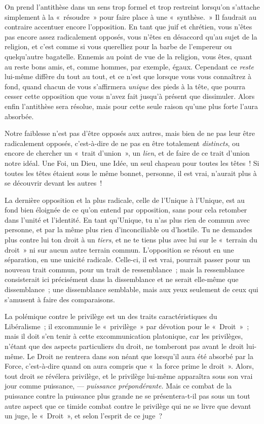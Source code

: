 \documentclass[french,twoside]{book} %
\begin{document}
On prend l’antithèse dans un sens trop formel et trop restreint lorsqu’on s’attache simplement à la « résoudre » pour faire place à une « synthèse. » Il faudrait au contraire accentuer encore l’opposition. En tant que juif et chrétien, vous n’êtes pas encore assez radicalement opposés, vous n’êtes en désaccord qu’au sujet de la religion, et c’est comme si vous querelliez pour la barbe de l’empereur ou quelqu’autre bagatelle. Ennemis au point de vue de la religion, vous êtes, quant au reste bons amis, et, comme hommes, par exemple, égaux. Cependant ce \emph{reste }lui-même diffère du tout au tout, et ce n’est que lorsque vous vous connaîtrez à fond, quand chacun de vous s’affirmera \emph{unique} des pieds à la tête, que pourra cesser cette opposition que vous n’avez fait jusqu’à présent que dissimuler. Alors enfin l’antithèse sera résolue, mais pour cette seule raison qu’une plus forte l’aura absorbée.\par
Notre faiblesse n’est pas d’être opposés aux autres, mais bien de ne pas leur être radicalement opposés, c’est-à-dire de ne pas en être totalement \emph{distincts}, ou encore de chercher un « trait d’union », un \emph{lien}, et de faire de ce trait d’union notre idéal. Une Foi, un Dieu, une Idée, un seul chapeau pour toutes les têtes ! Si toutes les têtes étaient sous le même bonnet, personne, il est vrai, n’aurait plus à se découvrir devant les autres !\par
La dernière opposition et la plus radicale, celle de l’Unique à l’Unique, est au fond bien éloignée de ce qu’on entend par opposition, sans pour cela retomber dans l’unité et l’identité. En tant qu’Unique, tu n’as plus rien de commun avec personne, et par la même plus rien d’inconciliable ou d’hostile. Tu ne demandes plus contre lui ton droit à un \emph{tiers}, et ne te tiens plus avec lui sur le « terrain du droit » ni sur aucun autre terrain commun. L’opposition se résout en une séparation, en une unicité radicale.  Celle-ci, il est vrai, pourrait passer pour un nouveau trait commun, pour un trait de ressemblance ; mais la ressemblance consisterait ici précisément dans la dissemblance et ne serait elle-même que dissemblance ; une dissemblance semblable, mais aux yeux seulement de ceux qui s’amusent à faire des comparaisons.\par
La polémique contre le privilège est un des traits caractéristiques du Libéralisme ; il excommunie le « privilège » par dévotion pour le « Droit » ; mais il doit s’en tenir à cette excommunication platonique, car les privilèges, n’étant que des aspects particuliers du droit, ne tomberont pas avant le droit lui-même. Le Droit ne rentrera dans son néant que lorsqu’il aura été absorbé par la Force, c’est-à-dire quand on aura compris que « la force prime le droit ». Alors, tout droit se révélera privilège, et le privilège lui-même apparaîtra sous son vrai jour comme puissance, — \emph{puissance prépondérante.} Mais ce combat de la puissance contre la puissance plus grande ne se présentera-t-il pas sous un tout autre aspect que ce timide combat contre le privilège qui ne se livre que devant un juge, le « Droit », et selon l’esprit de ce juge ?\par
\end{document}
